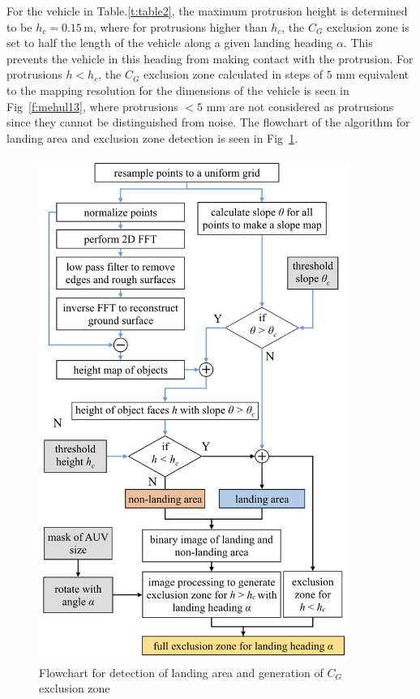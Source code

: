 For the vehicle in Table.\ref{t:table2}, the maximum protrusion height is determined to be $h_c=0.15$\,m, where for protrusions higher than $h_c$, the $C_G$ exclusion zone is set to half the length of the vehicle along a given landing heading $\alpha$. This prevents the vehicle in this heading from making contact with the protrusion. For protrusions $h<h_c$, the $C_G$ exclusion zone calculated in steps of $5$ mm equivalent to the mapping resolution for the dimensions of the vehicle is seen in Fig~\ref{f:mehul13}, where protrusions $<5$ mm are not considered as protrusions since they cannot be distinguished from noise. The flowchart of the algorithm for landing area and exclusion zone detection is seen in Fig~\ref{f:mehul14}.\\
\begin{figure}[!ht]
\centering
\includegraphics[width=4in]{./images/mehul14.png}
\caption{Flowchart for detection of landing area and generation of $C_G$ exclusion zone}
\label{f:mehul14}
\end{figure}

